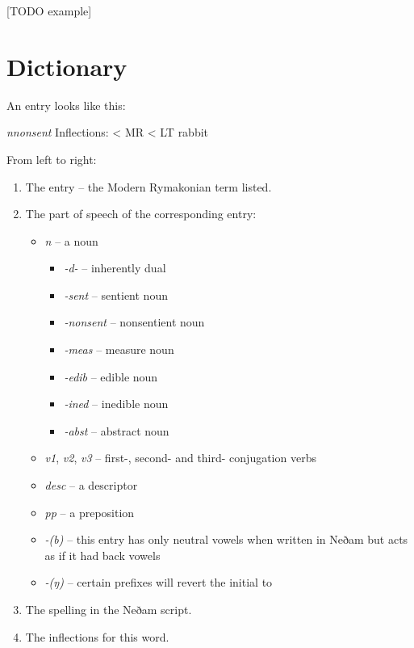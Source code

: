 \documentclass{book}
\newcommand{\lname}{Modern Rymakonian}
\begin{document}
{}[TODO example]

\appendix

\chapter{Dictionary}

An entry looks like this:

 \textit{nnonsent}
\quad {} \quad Inflections:  \quad < MR  < LT  \quad rabbit

From left to right:

\begin{enumerate}
    \item The entry -- the \lname{} term listed.
    \item The part of speech of the corresponding entry:
    \begin{itemize}
        \item \textit{n} -- a noun
        \begin{itemize}
          \item \textit{-d-} -- inherently dual
          \item \textit{-sent} -- sentient noun
          \item \textit{-nonsent} -- nonsentient noun
          \item \textit{-meas} -- measure noun
          \item \textit{-edib} -- edible noun
          \item \textit{-ined} -- inedible noun
          \item \textit{-abst} -- abstract noun
        \end{itemize}
        \item \textit{v1}, \textit{v2}, \textit{v3} -- first-, second- and third- conjugation verbs
        \item \textit{desc} -- a descriptor
        \item \textit{pp} -- a preposition
        \item \textit{-(b)} -- this entry has only neutral vowels when written in Neðam but acts as if it had back vowels
        \item \textit{-(ŋ)} -- certain prefixes will revert the initial  to 
    \end{itemize}
    \item The spelling in the Neðam script.
    \item The inflections for this word.

\end{enumerate}
\end{document}

